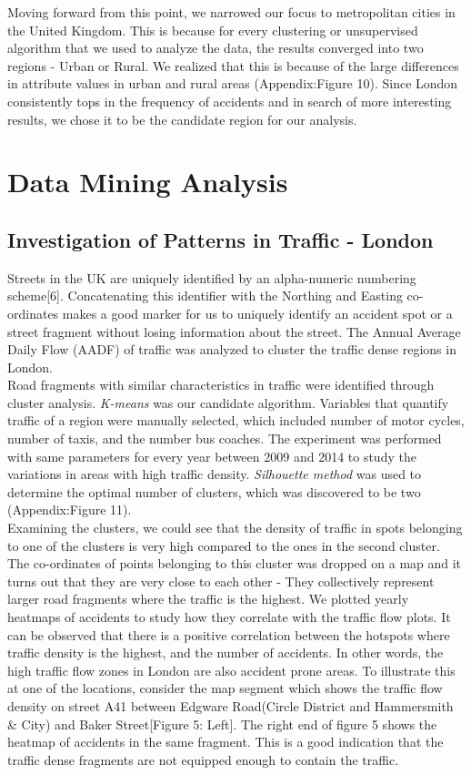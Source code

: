 \documentclass{neu_handout}
\begin{document}
Moving forward from this point, we narrowed our focus to metropolitan cities in the United Kingdom. This is because for every clustering or unsupervised algorithm that we used to analyze the data, the results converged into two regions - Urban or Rural. We realized that this is because of the large differences in attribute values in urban and rural areas (Appendix:Figure 10). Since London consistently  tops in the frequency of accidents and in search of more interesting results, we chose it to be the candidate region for our analysis.

\section{Data Mining Analysis}

\subsection{Investigation of Patterns in Traffic - London}
Streets in the UK are uniquely identified by an alpha-numeric numbering scheme[6]. Concatenating this identifier with the Northing and Easting co-ordinates makes a good marker for us to uniquely identify an accident spot or a street fragment without losing information about the street. The Annual Average Daily Flow (AADF) of traffic was analyzed to cluster the traffic dense regions in London. \\

Road fragments with similar characteristics in traffic were identified through cluster analysis. \textit{K-means} was our candidate algorithm. Variables that quantify traffic of a region were manually selected, which included number of motor cycles, number of taxis, and the number bus coaches. The  experiment was performed with same parameters for every year between 2009 and 2014 to study the variations in areas with high traffic density. \textit{Silhouette method} was used to determine the optimal number of clusters, which was discovered to be two (Appendix:Figure 11).\\

Examining the clusters, we could see that the density of traffic in spots belonging to one of the clusters is very high compared to the ones in the second cluster. The co-ordinates of points belonging to this cluster was dropped on a map and it turns out that they are very close to each other - They collectively represent larger road fragments where the traffic is the highest. We plotted yearly heatmaps of accidents to study how they correlate with the traffic flow plots. It can be observed that there is a positive correlation between the hotspots where traffic density is the highest, and the number of accidents. In other words, the high traffic flow zones in London are also accident prone areas. To illustrate this at one of the locations, consider the map segment which shows the traffic flow density on street A41 between Edgware Road(Circle District and Hammersmith \& City) and Baker Street[Figure 5: Left]. The right end of figure 5 shows the heatmap of accidents in the same fragment. This is a good indication that the traffic dense fragments are not equipped enough to contain the traffic. \\
\end{document}
